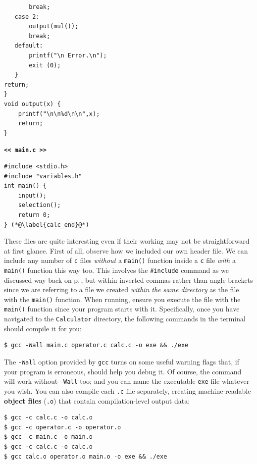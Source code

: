 \documentclass[11pt,oneside]{article}
\begin{document}
{{{{{{{{{{{{\begin{multicols}{2}
\begin{lstlisting}
       break;
   case 2:
       output(mul());
       break;
   default:
       printf("\n Error.\n");
       exit (0);
   }
return;
}
void output(x) {
    printf("\n\n%d\n\n",x);
    return;
}
\end{lstlisting}
\textbf{\texttt{<< main.c >>}}\vspace{-0.5cm}
\begin{lstlisting}
#include <stdio.h>
#include "variables.h"
int main() {
    input();
    selection();
    return 0;
} (*@\label{calc_end}@*)
\end{lstlisting}
\end{multicols}
\vspace*{-0.5cm}
These files are quite interesting even if their working may not be straightforward at first glance. First of all, observe how we included our own header file. We can include any number of \verb+c+ files \textit{without} a \verb+main()+ function inside a \verb+c+ file \textit{with} a \verb+main()+ function this way too. This involves the \verb+#include+ command as we discussed way back on p.\,\pageref{cmd:include}, but within inverted commas rather than angle brackets since we are referring to a file we created \textit{within the same directory} as the file with the \verb+main()+ function. When running, ensure you execute the file with the \verb+main()+ function since your program starts with it. Specifically, once you have navigated to the \verb+Calculator+ directory, the following commands in the terminal should compile it for you:

\begin{lstlisting}
$ gcc -Wall main.c operator.c calc.c -o exe && ./exe
\end{lstlisting}

The \verb+-Wall+ option provided by \verb+gcc+ turns on some useful warning flags that, if your program is erroneous, should help you debug it. Of course, the command will work without \verb+-Wall+ too; and you can name the executable \verb+exe+ file whatever you wish. You can also compile each \verb+.c+ file separately, creating machine-readable \textbf{object files} (\verb+.o+) that contain compilation-level output data:

\begin{lstlisting}
$ gcc -c calc.c -o calc.o
$ gcc -c operator.c -o operator.o
$ gcc -c main.c -o main.o
$ gcc -c calc.c -o calc.o
$ gcc calc.o operator.o main.o -o exe && ./exe
\end{lstlisting}

}}}}}}}}}}}}
\end{document}
